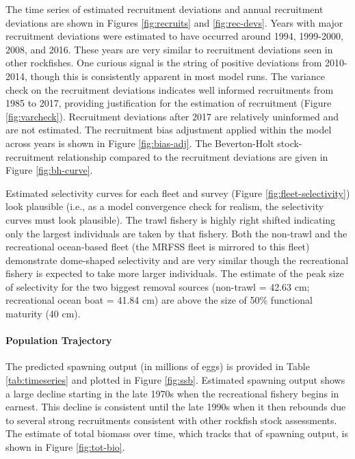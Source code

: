 \documentclass[11pt,
  english,
  letterpaper,
]{article}
\begin{document}
The time series of estimated recruitment deviations and annual recruitment deviations are shown in Figures \ref{fig:recruits} and \ref{fig:rec-devs}. Years with major recruitment deviations were estimated to have occurred around 1994, 1999-2000, 2008, and 2016. These years are very similar to recruitment deviations seen in other rockfishes. One curious signal is the string of positive deviations from 2010-2014, though this is consistently apparent in most model runs. The variance check on the recruitment deviations indicates well informed recruitments from 1985 to 2017, providing justification for the estimation of recruitment (Figure \ref{fig:varcheck}). Recruitment deviations after 2017 are relatively uninformed and are not estimated. The recruitment bias adjustment applied within the model across years is shown in Figure \ref{fig:bias-adj}. The Beverton-Holt stock-recruitment relationship compared to the recruitment deviations are given in Figure \ref{fig:bh-curve}.

Estimated selectivity curves for each fleet and survey (Figure \ref{fig:fleet-selectivity}) look plausible (i.e., as a model convergence check for realism, the selectivity curves must look plausible). The trawl fishery is highly right shifted indicating only the largest individuals are taken by that fishery. Both the non-trawl and the recreational ocean-based fleet (the MRFSS fleet is mirrored to this fleet) demonstrate dome-shaped selectivity and are very similar though the recreational fishery is expected to take more larger individuals. The estimate of the peak size of selectivity for the two biggest removal sources (non-trawl = 42.63 cm; recreational ocean boat = 41.84 cm) are above the size of 50\% functional maturity (40 cm).

\hypertarget{population-trajectory}{%
\paragraph{Population Trajectory}\label{population-trajectory}}

The predicted spawning output (in millions of eggs) is provided in Table \ref{tab:timeseries} and plotted in Figure \ref{fig:ssb}. Estimated spawning output shows a large decline starting in the late 1970s when the recreational fishery begins in earnest. This decline is consistent until the late 1990s when it then rebounds due to several strong recruitments consistent with other rockfish stock assessments. The estimate of total biomass over time, which tracks that of spawning output, is shown in Figure \ref{fig:tot-bio}.
\end{document}
